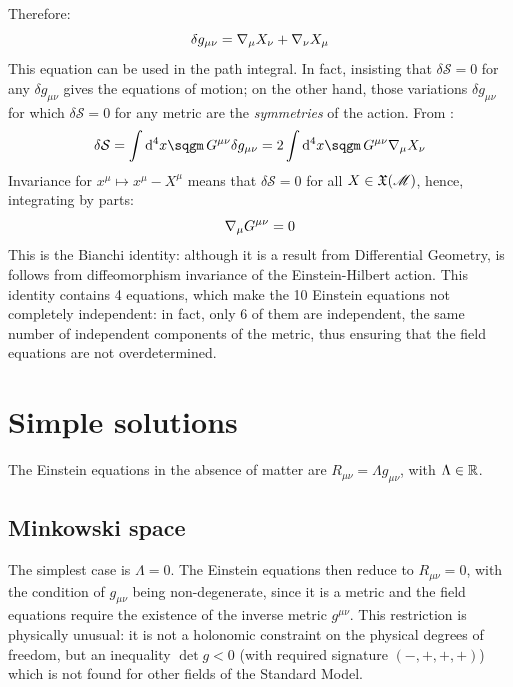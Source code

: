 Therefore:
\begin{equation}
  \delta g_{\mu \nu} = \nabla_\mu X_\nu + \nabla_\nu X_\mu
  \label{eq:metric-variation}
\end{equation}
This equation can be used in the path integral. In fact, insisting that $ \delta \mathcal{S} = 0 $ for any $ \delta g_{\mu \nu} $ gives the equations of motion; on the other hand, those variations $ \delta g_{\mu \nu} $ for which $ \delta \mathcal{S} = 0 $ for any metric are the \textit{symmetries} of the action. From :
\begin{equation*}
  \delta \mathcal{S} = \int \dd^4 x \sqgm\, G^{\mu \nu} \delta g_{\mu \nu} = 2 \int \dd^4 x \sqgm\, G^{\mu \nu} \na_\mu X_\nu
\end{equation*}
Invariance for $ x^\mu \mapsto x^\mu - X^\mu $ means that $ \delta \mathcal{S} = 0 $ for all $ X \in \mathfrak{X}(\mathscr{M}) $, hence, integrating by parts:
\begin{equation}
  \nabla_\mu G^{\mu \nu} = 0
  \label{eq:bianchi-id}
\end{equation}
This is the Bianchi identity: although it is a result from Differential Geometry, is follows from diffeomorphism invariance of the Einstein-Hilbert action. This identity contains 4 equations, which make the 10 Einstein equations not completely independent: in fact, only 6 of them are independent, the same number of independent components of the metric, thus ensuring that the field equations are not overdetermined.

\newpage
\section{Simple solutions}

The Einstein equations in the absence of matter are $ R_{\mu \nu} = \Lambda g_{\mu \nu} $, with $ \Lambda \in \mathbb{R} $.

\subsection{Minkowski space}

The simplest case is $ \Lambda = 0 $. The Einstein equations then reduce to $ R_{\mu \nu} = 0 $, with the condition of $ g_{\mu \nu} $ being non-degenerate, since it is a metric and the field equations require the existence of the inverse metric $ g^{\mu \nu} $. This restriction is physically unusual: it is not a holonomic constraint on the physical degrees of freedom, but an inequality $ \det g < 0 $ (with required signature $ (-,+,+,+) $) which is not found for other fields of the Standard Model.

